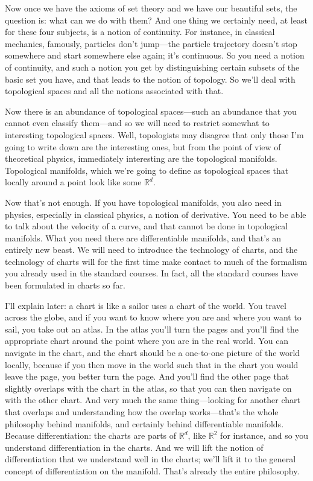 Now once we have the axioms of set theory and we have our beautiful sets, the question is: what can we do with them? And one thing we certainly need, at least for these four subjects, is a notion of continuity. For instance, in classical mechanics, famously, particles don't jump---the particle trajectory doesn't stop somewhere and start somewhere else again; it's continuous. So you need a notion of continuity, and such a notion you get by distinguishing certain subsets of the basic set you have, and that leads to the notion of topology. So we'll deal with topological spaces and all the notions associated with that.

Now there is an abundance of topological spaces---such an abundance that you cannot even classify them---and so we will need to restrict somewhat to interesting topological spaces. Well, topologists may disagree that only those I'm going to write down are the interesting ones, but from the point of view of theoretical physics, immediately interesting are the topological manifolds. Topological manifolds, which we're going to define as topological spaces that locally around a point look like some $\mathbb{R}^d$.

Now that's not enough. If you have topological manifolds, you also need in physics, especially in classical physics, a notion of derivative. You need to be able to talk about the velocity of a curve, and that cannot be done in topological manifolds. What you need there are differentiable manifolds, and that's an entirely new beast. We will need to introduce the technology of charts, and the technology of charts will for the first time make contact to much of the formalism you already used in the standard courses. In fact, all the standard courses have been formulated in charts so far.

I'll explain later: a chart is like a sailor uses a chart of the world. You travel across the globe, and if you want to know where you are and where you want to sail, you take out an atlas. In the atlas you'll turn the pages and you'll find the appropriate chart around the point where you are in the real world. You can navigate in the chart, and the chart should be a one-to-one picture of the world locally, because if you then move in the world such that in the chart you would leave the page, you better turn the page. And you'll find the other page that slightly overlaps with the chart in the atlas, so that you can then navigate on with the other chart. And very much the same thing---looking for another chart that overlaps and understanding how the overlap works---that's the whole philosophy behind manifolds, and certainly behind differentiable manifolds. Because differentiation: the charts are parts of $\mathbb{R}^d$, like $\mathbb{R}^2$ for instance, and so you understand differentiation in the charts. And we will lift the notion of differentiation that we understand well in the charts; we'll lift it to the general concept of differentiation on the manifold. That's already the entire philosophy.


